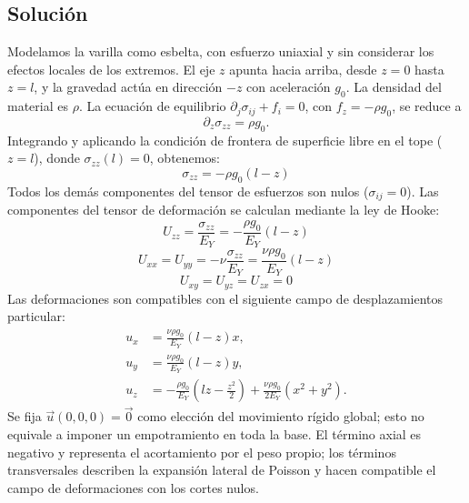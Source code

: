 \documentclass[a4paper]{article}
\begin{document}
\subsection{Solución}
Modelamos la varilla como esbelta, con esfuerzo uniaxial y sin considerar los efectos locales de los extremos. El eje $z$ apunta hacia arriba, desde $z=0$ hasta $z=l$, y la gravedad actúa en dirección $-z$ con aceleración $g_0$. La densidad del material es $\rho$.
La ecuación de equilibrio $\partial_j\sigma_{ij}+f_i=0$, con $f_z=-\rho g_0$, se reduce a
$$ \partial_z \sigma_{zz} = \rho g_0. $$
Integrando y aplicando la condición de frontera de superficie libre en el tope ($z=l$), donde $\sigma_{zz}(l) = 0$, obtenemos:
$$ \sigma_{zz} = -\rho g_0 (l - z) $$
Todos los demás componentes del tensor de esfuerzos son nulos ($\sigma_{ij} = 0$).
Las componentes del tensor de deformación se calculan mediante la ley de Hooke:
$$ U_{zz} = \frac{\sigma_{zz}}{E_Y} = -\frac{\rho g_0}{E_Y} (l - z) $$
$$ U_{xx} = U_{yy} = -\nu \frac{\sigma_{zz}}{E_Y} = \frac{\nu \rho g_0}{E_Y} (l - z) $$
$$ U_{xy} = U_{yz} = U_{zx} = 0 $$
Las deformaciones son compatibles con el siguiente campo de desplazamientos particular:
$$
\begin{aligned}
u_x&=\frac{\nu\rho g_0}{E_Y}(l-z)x,\\
u_y&=\frac{\nu\rho g_0}{E_Y}(l-z)y,\\
u_z&=-\frac{\rho g_0}{E_Y}\left(lz-\frac{z^2}{2}\right)
     +\frac{\nu\rho g_0}{2E_Y}(x^2+y^2).
\end{aligned}
$$
Se fija $\vec{u}(0,0,0)=\vec{0}$ como elección del movimiento rígido global; esto no equivale a imponer un empotramiento en toda la base. El término axial es negativo y representa el acortamiento por el peso propio; los términos transversales describen la expansión lateral de Poisson y hacen compatible el campo de deformaciones con los cortes nulos.
\end{document}
